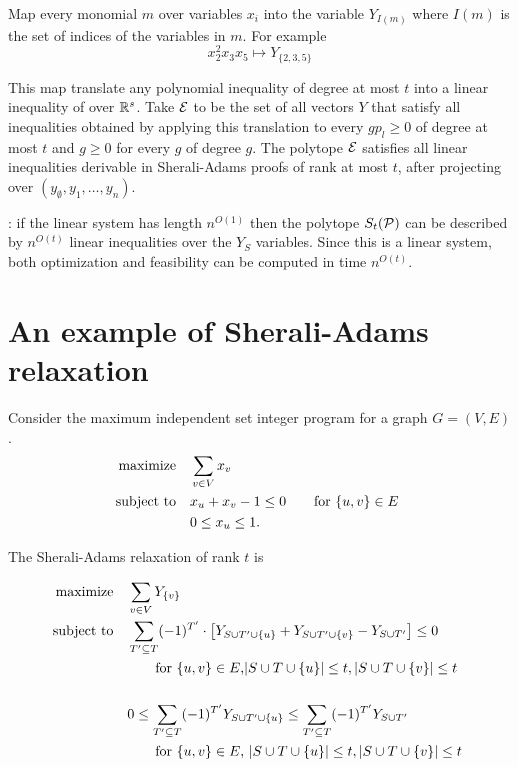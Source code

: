 \documentclass[a4paper,twoside,justified]{tufte-handout}
\begin{document}
Map every monomial $m$ over variables $ x_{i} $ into the variable $
Y_{I(m)}$ where $ I(m) $ is the set of indices of the variables in $ m
$.  For example
\begin{equation*}
x^{2}_{2} x_{3}x_{5} \mapsto Y_{\{2,3,5\}} 
\end{equation*}

This map translate any polynomial inequality of degree at most $ t
$ into a linear inequality of over $ \mathbb{R}^{s} $. Take $ \mathcal{E} $ to be
the set of all vectors $ Y $ that satisfy all inequalities obtained by
applying this translation to every $ g p_{l} \geq 0$ of degree at most
$t$ and $ g \geq 0 $ for every $ g $ of degree $ g $. The polytope $
\mathcal{E} $ satisfies all linear inequalities derivable in Sherali-Adams
proofs of rank at most $ t $, after projecting over $
(y_{\emptyset},y_{1},\ldots,y_{n})$.


: if the linear system has length $
n^{O(1)} $ then the polytope $ S_{t}(\mathcal{P}) $ can be described by $
n^{O(t)} $ linear inequalities over the $ Y_{S} $ variables. Since
this is a linear system, both optimization and feasibility can be
computed in time $ n^{O(t)} $.

\section{An example of Sherali-Adams relaxation}

Consider the maximum independent set integer program for a graph $
G=(V,E)$.
\begin{alignat}{2}
  \text{maximize}\hspace{1em}& \sum_{v\in V} x_{v}\notag \\
  \text{subject to}\hspace{1em}& x_{u} + x_{v} - 1\leq 0 \qquad \text{for $ \{u,v\}\in E $ }\\
  & 0 \leq x_{u}\leq 1.\notag
\end{alignat}

The Sherali-Adams relaxation of rank $t$ is

\begin{alignat*}{2}
  \text{maximize}\hspace{1em}& \sum_{v\in V} Y_{\{v\}}\notag \\
  \text{subject to}\hspace{1em}& \sum_{T'\subseteq T} (-1)^{T'} \cdot 
  \left[ 
    Y_{S\cup T'\cup \{u\} } + Y_{S\cup T'\cup \{v\} } - Y_{S\cup T'}
  \right]
  \leq 0 \\ 
  &\qquad \text{for $ \{u,v\}\in E $,$ |S\cup T\cup \{u\}| \leq
    t,|S\cup T\cup \{v\}|\leq t $}\\
  \\
  &0 \leq \sum_{T'\subseteq T} (-1)^{T'} Y_{S\cup T'\cup \{u\} } \leq
  \sum_{T'\subseteq T} (-1)^{T'} Y_{S\cup T' }\\
  &\qquad \text{for $ \{u,v\}\in E $, $|S\cup T\cup \{u\}| \leq
    t,|S\cup T\cup \{v\}|\leq t $  }
\end{alignat*}




\end{document}
